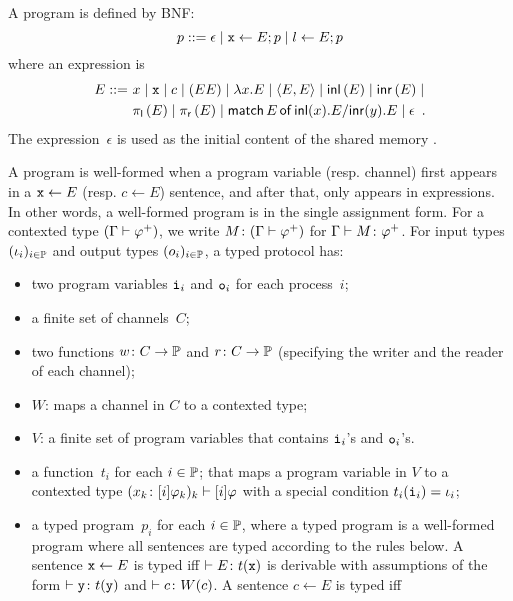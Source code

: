 {A program is defined by BNF:
\[
 p ::= \epsilon\mid
 \texttt{x}\leftarrow E; p \mid
 l \leftarrow E; p
\]
where an expression is
\begin{align*}
 E
 ::=\,\,
 &x\mid \texttt{x} \mid c \mid (EE)\mid \lambda
 x.E\mid \langle{E,E}\rangle\mid \mathsf{inl}\left({E}\right)\mid \mathsf{inr}\left({E}\right)\mid \\
 &\pi_{\mathsf l}\left({E}\right)\mid\pi_{\mathsf r}\left({E}\right)\mid  \mathsf{match}\,{E}\,\mathsf{of}\, \mathsf{inl}({x}). {E}/ \mathsf{inr}({y}). {E}\mid \epsilon\enspace.
\end{align*}
The expression~$\epsilon$ is used as the initial content of the shared
memory .

\newcommand{\Wg}{W_{\mathrm g}}
\newcommand{\Wd}{W_{\mathrm d}}
A program is well-formed when
a program variable (resp. channel) first appears in a $\texttt{x}\leftarrow E$
(resp. $c\leftarrow E$)
sentence, and
after that, only appears in expressions.
In other words, a well-formed program is in the single assignment form.
For a contexted type $(\Gamma\vdash{\varphi}^+)$,
we write ${M} \colon{(\Gamma\vdash{\varphi}^+)}$ for
$\Gamma\vdash{M} \colon{{\varphi}^+}$.
For input types $(\iota_i)_{i\in\mathbb{P}}$
and output types $(o_i)_{i\in\mathbb{P}}$,
a typed protocol has:
\begin{itemize}
 \item two program variables
      $\texttt{i}_i$ and $\texttt{o}_i$ for each process~$i$;
 \item a finite set of channels~$C$;
 \item two functions $w\colon C\rightarrow \mathbb{P}$
       and $r\colon C\rightarrow
       \mathbb{P}$ (specifying the writer and the reader of
       each channel);
 \item $W$: maps a channel in $C$ to a contexted type;
 \item $V$: a finite set of program variables that contains $\texttt{i}_i$'s
       and $\texttt{o}_i$'s.
 \item a function~$t_i$ for each $i\in \mathbb{P}$;
       that maps a program variable in $V$ to a contexted type
       $({x_k} \colon{[i]\varphi_k})_k \vdash[i]\varphi$ with a special condition
       $t_i(\texttt{i}_i)= \iota_i$;
 \item a typed program~$p_i$ for each $i\in \mathbb{P}$, where
       a typed program is a well-formed program where all
       sentences are typed according to the rules below.
       A sentence $\texttt{x} \leftarrow E$ is typed  iff $\vdash E\colon t(\texttt{x})$ is derivable with assumptions of the form $\vdash{\texttt{y}} \colon{t(\texttt{y})}$ and $\vdash{c} \colon{W(c)}$.
       A sentence $c\leftarrow E$ is typed iff

\end{itemize}}
